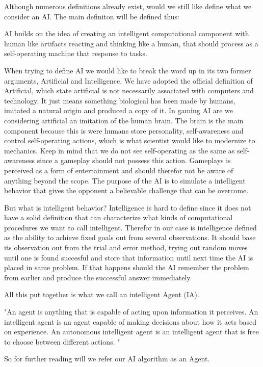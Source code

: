 Although numerous definitions already exist, would we still like define what we consider an AI. The main definiton will be defined thus:

 		AI builds on the idea of creating an intelligent computational component with human like artifacts 			reacting and thinking like a human, that should process as a self-operating machine that response to 		tasks.

When trying to define AI we would like to break the word up in its two former arguments, Artificial and Intelligence.
We have adopted the official definition of Artificial, which state artificial is not necessarily associated with computers and technology. It just means something biological has been made by humans, imitated a natural origin and produced a copy of it.
In gaming AI are we considering artificial an imitation of the human brain. The brain is the main component because this is were humans store personality, self-awareness and control self-operating actions, which is what scientist would like to modernize to mechanics.
Keep in mind that we do not see self-operating as the same as self-awareness since a gameplay should not possess this action. Gameplays is perceived as a form of entertainment and should therefor not be aware of anything beyond the scope. The purpose of the AI is to simulate a intelligent behavior that gives the opponent a believable challenge that can be overcome.

But what is intelligent behavior? Intelligence is hard to define since it does not have a solid definition that can characterize what kinds of computational procedures we want to call intelligent.
Therefor in our case is intelligence defined as the ability to achieve fixed goals out from several observations.
It should base its observation out from the trial and error method, trying out random moves until one is found succesful and store that information until next time the AI is placed in same problem. If that happens should the AI remember the problem from earlier and produce the successful answer immediately.

All this put together is what we call an intelligent Agent (IA).

"An agent is anything that is capable of acting upon information it perceives. An intelligent agent is an agent capable of making decisions about how it acts based on experience. An autonomous intelligent agent is an intelligent agent that is free to choose between different actions. "

So for further reading will we refer our AI algorithm as an Agent.


